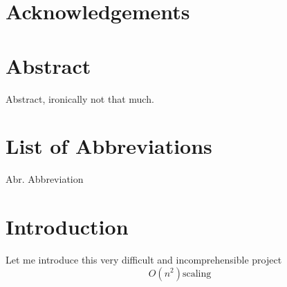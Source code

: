 \newpage
\section*{Acknowledgements}
\section*{Abstract}
 Abstract, ironically not that much.
 
 \section*{List of Abbreviations}
 Abr. Abbreviation
\section{Introduction}
Let me introduce this very difficult and incomprehensible project
\begin{equation*}
O(n^2) \textrm{scaling}
\end{equation*}